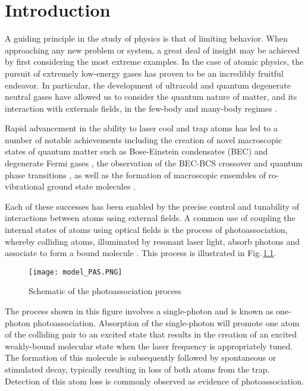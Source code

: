 \chapter{Introduction} \label{ch:intro}
A guiding principle in the study of physics is that of limiting behavior.
When approaching any new problem or system, a great deal of insight may be achieved by first considering the most extreme examples.
In the case of atomic physics, the pursuit of extremely low-energy gases has proven to be an incredibly fruitful endeavor.
In particular, the development of ultracold and quantum degenerate neutral gases have allowed us to consider the quantum nature of matter, and its interaction with externals fields, in the few-body and many-body regimes
\cite{gps08,Kohler2006,wbz99,ccg11,swm10,bdz08,Chin2010,Bertelson2007,mmn11,bdz08}.

Rapid advancement in the ability to laser cool and trap atoms \cite{Metcalf1999,mvs99,psm02} has led to a number of notable achievements including the creation of novel macroscopic states of quantum matter such as Bose-Einstein condensates (BEC) and degenerate Fermi gases \cite{aem95,Bradley1995,dma95,DeMarco1999,zhg03,MartinezdeEscolar2010,Mickelson2010ja,dym10a,stg10}, the observation of the BEC-BCS crossover and quantum phase transitions \cite{rgj04,zss04,cba04Science,Bourdel2004,grj03,Greiner2002,jsg08,Snoke2002,zbb14}, as well as the formation of macroscopic ensembles of ro-vibrational ground state molecules \cite{rtb03,Jones2006, Reinaudi2012,Stellmer2012,nom08,Lang2008}.

Each of these successes has been enabled by the precise control and tunability of interactions between atoms using external fields.
A common use of coupling the internal states of atoms using optical fields is the process of photoassociation, whereby colliding atoms, illuminated by resonant laser light, absorb photons and associate to form a bound molecule \cite{Kohler2006, Jones2006, Chin2010, Burnett2002}.
This process is illustrated in Fig.\,\ref{fig:1pasSch}.
\begin{figure} 
	\centerline{
	\texttt{[image: model\_PAS.PNG]}}
	\caption{Schematic of the photoassociation process}{}
	\label{fig:1pasSch}
\end{figure}
The process shown in this figure involves a single-photon and is known as one-photon photoassociation.
Absorption of the single-photon will promote one atom of the colliding pair to an excited state that results in the creation of an excited weakly-bound molecular state when the laser frequency is appropriately tuned.
The formation of this molecule is subsequently followed by spontaneous or stimulated decay, typically resulting in loss of both atoms from the trap.
Detection of this atom loss is commonly observed as evidence of photoassociation.

